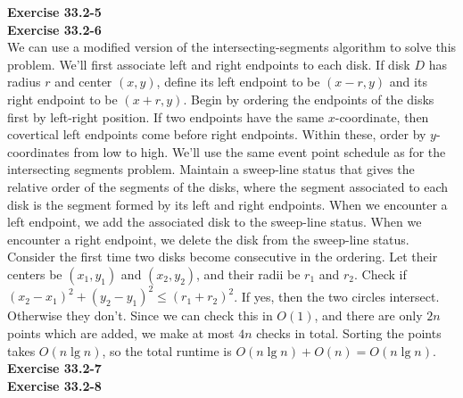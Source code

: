 \documentclass{article}
\begin{document}
\noindent\textbf{Exercise 33.2-5}\\



\noindent\textbf{Exercise 33.2-6}\\

We can use a modified version of the intersecting-segments algorithm to solve this problem.  We'll first associate left and right endpoints to each disk.  If disk $D$ has radius $r$ and center $(x,y)$, define its left endpoint to be $(x-r,y)$ and its right endpoint to be $(x+r,y)$.  Begin by ordering the endpoints of the disks first by left-right position.  If two endpoints have the same $x$-coordinate, then covertical left endpoints come before right endpoints.  Within these, order by $y$-coordinates from low to high. We'll use the same event point schedule as for the intersecting segments problem.  Maintain a sweep-line status that gives the relative order of the segments of the disks, where the segment associated to each disk is the segment formed by its left and right endpoints.  When we encounter a left endpoint, we add the associated disk to the sweep-line status.  When we encounter a right endpoint, we delete the disk from the sweep-line status.  Consider the first time two disks become consecutive in the ordering.  Let their centers be $(x_1,y_1)$ and $(x_2,y_2)$, and their radii be $r_1$ and $r_2$.  Check if $(x_2-x_1)^2 + (y_2-y_1)^2 \leq (r_1+r_2)^2$.  If yes, then the two circles intersect.  Otherwise they don't.  Since we can check this in $O(1)$, and there are only $2n$ points which are added, we make at most $4n$ checks in total.  Sorting the points takes $O(n\lg n)$, so the total runtime is $O(n\lg n) + O(n) = O(n\lg n)$. \\

\noindent\textbf{Exercise 33.2-7}\\



\noindent\textbf{Exercise 33.2-8}\\
\end{document}
